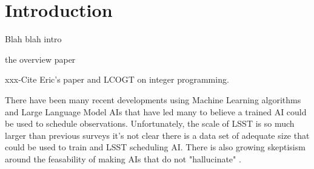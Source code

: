\documentclass[]{aastex631}
\begin{document}


\section{Introduction} \label{sec:intro}
Blah blah intro

the overview paper \citet{Rubin_overview2019}

xxx-Cite Eric's paper \citep{Bellm2019} and LCOGT \citep{Lampoudi2015} on integer programming.

There have been many recent developments using Machine Learning algorithms and Large Language Model AIs that have led many to believe a trained AI could be used to schedule observations. Unfortunately, the scale of LSST is so much larger than previous surveys it's not clear there is a data set of adequate size that could be used to train and LSST scheduling AI. There is also growing skeptisism around the feasability of making AIs that do not "hallucinate" \citep{Hicks24}.
\end{document}
